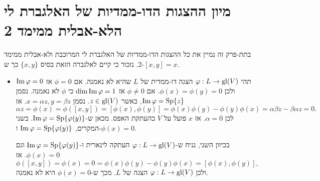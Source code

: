 \documentclass{report}
\theoremstyle{break}
\theoremstyle{MyNonumberbreak}
\DeclareMathOperator{\Sp}{Sp}
\begin{document}
\section{מיון ההצגות הדו-ממדיות של האלגברת לי הלא-אבלית ממימד 2}
בתת-פרק זה נמיין את כל ההצגות הדו-ממדיות של האלגברת לי המרוכבת ולא-אבלית ממימד 2. נזכור כי קיים לאלגברה הזאת בסיס $\{x, y\}$ כך ש-$[x, y] = x$.
\begin{itemize}
	\item 
	תהי $\varphi : L \to \operatorname{gl}(V)$ הצגה דו-ממדית של $L$ שהיא לא נאמנה. אם $\phi = 0$ אז $\operatorname{Im}\varphi = 0$ ולכן $\phi(x) = \phi(y) = 0$. אם $\phi \neq 0$ אז $\dim\operatorname{Im}\varphi = 1$ כי $\phi$ לא נאמנה. נסמן $\Img\phi = \Sp\{z\}$, כאשר $z \in \operatorname{gl}(V)$. נסמן $x = \alpha z, y = \beta z$. אז
\[ \alpha z = \phi(x) = \phi([x, y]) = [\phi(x), \phi(y)] = \phi(x)\phi(y) - \phi(y)\phi(x) = \alpha\beta z - \beta\alpha z = 0. \]
	לכן $\alpha = 0$. אז $x$ פועל על $V$ כהעתקת האפס. מכאן ש-$\Img\phi = \Sp\{\phi(y)\}$. בשני המקרים, $\Img\phi = \Sp\{\phi(y)\}$ ו-$\phi(x) = 0$. 
	
	בכיוון השני, נניח ש-$\varphi : L \to \operatorname{gl}(V)$ העתקה לינארית ו-$\Img\phi = \Sp\{\phi(y)\}$ וגם $\phi(x) = 0$. אז
\[ \phi([x, y]) = \phi(x) = 0 = \phi(x)\phi(y) - \phi(y)\phi(x) = [\phi(x), \phi(y)], \]
	ולכן $\varphi : L \to \operatorname{gl}(V)$ הצגה של $L$. מכך ש-$\phi(x) = 0$ היא לא נאמנה.


\end{itemize}
\end{document}
